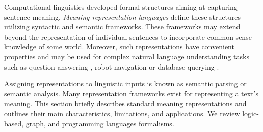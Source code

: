 Computational linguistics developed formal structures aiming at capturing sentence meaning. \textit{Meaning representation languages} define these structures utilizing syntactic and semantic frameworks. These frameworks may extend beyond the representation of individual sentences to incorporate common-sense knowledge of some world. Moreover, such representations have convenient properties and may be used for complex natural language understanding tasks such as question answering \parencite{pasupat_15}, robot navigation \parencite{artzi2013weakly} or database querying \parencite{zelle1996learning}.

Assigning representations to linguistic inputs is known as semantic parsing or semantic analysis. Many representation frameworks exist for representing a text's meaning. This section briefly describes standard meaning representations and outlines their main characteristics, limitations, and applications. We review logic-based, graph, and programming languages formalisms.



